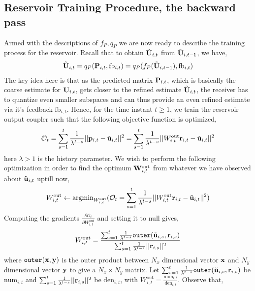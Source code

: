 \documentclass[conference]{IEEEtran}
\begin{document}
\subsection{Reservoir Training Procedure, the backward pass}
\label{train}
Armed with the descriptions of $f_P, q_P$ we are now ready to describe the training process for the reservoir.
Recall that to obtain $\tilde{{\bf U}}_{i,t}$ from  $\tilde{{\bf U}}_{i,t-1}$, we have,
\begin{equation}
\tilde{\bU}_{i,t}=q_P(\bP_{i,t},\text{fb}_{i,t})=q_P(f_P(\tilde{\bU}_{i,t-1}),\text{fb}_{i,t})
\label{fpqp}
\end{equation}
The key idea here is that as the predicted matrix ${\bf P}_{i,t}$, which is basically the coarse estimate for ${\bf U}_{i,t}$, gets closer to the refined estimate $\tilde{{\bf U}}_{i,t}$, the receiver has to quantize even smaller subspaces and can thus provide an even refined estimate via it's feedback $\text{fb}_{i,t}$.
Hence, for the time instant $t\geq1$, we train the reservoir output coupler such that the following objective function is optimized,
\begin{equation}
\mathcal{O}_t=\sum_{s=1}^{t}\frac{1}{\lambda^{t-s}}||{\bf p}_{i,t}-\tilde{{\bf u}}_{i,t}||^2=\sum_{s=1}^{t}\frac{1}{\lambda^{t-s}}||W_{i,t}^{\text{out}}{\bf r}_{i,t}-\tilde{{\bf u}}_{i,t}||^2
\end{equation}
here $\lambda>1$ is the history parameter. We wish to perform the following optimization in order to find the optimum ${\bf W}_{i,t}^{\text{out}}$ from whatever we have observed about $\tilde{{\bf u}}_{i,t}$ uptill now,
\begin{equation}
W_{i,t}^{\text{out}}\gets\text{argmin}_{W_{i,t}^{\text{out}}}(\mathcal{O}_t=\sum_{s=1}^{t}\frac{1}{\lambda^{t-s}}||W_{i,t}^{\text{out}}{\bf r}_{i,t}-\tilde{{\bf u}}_{i,t}||^2)
\end{equation}
Computing the gradients $\frac{\partial \mathcal{O}_t}{\partial W_{i,t}^{\text{out}}}$ and setting it to null gives,
\begin{equation}
W_{i,t}^{\text{out}}=\frac{\sum_{s=1}^{t}\frac{1}{\lambda^{t-s}}\texttt{outer}(\tilde{{\bf u}}_{i,s},{\bf r}_{i,s})}{\sum_{s=1}^{t}\frac{1}{\lambda^{t-s}}||{\bf r}_{i,s}||^2}
\end{equation}
where $\texttt{outer}({\bf x},{\bf y})$ is the outer product between $N_x$ dimensional vector ${\bf x}$ and $N_y$ dimensional vector ${\bf y}$ to give a $N_x\times N_y$ matrix. Let $\sum_{s=1}^{t}\frac{1}{\lambda^{t-s}}\texttt{outer}(\tilde{{\bf u}}_{i,s},{\bf r}_{i,s})$ be $\text{num}_{i,t}$ and $\sum_{s=1}^{t}\frac{1}{\lambda^{t-s}}||{\bf r}_{i,s}||^2$ be $\text{den}_{i,t}$, with $W_{i,t}^{\text{out}}=\frac{\text{num}_{i,t}}{\text{den}_{i,t}}$. Observe that,
\end{document}
